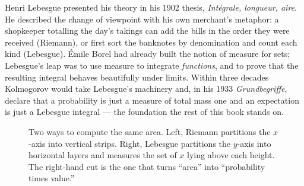 \begin{historybox}
Henri Lebesgue presented his theory in his 1902 thesis,
\emph{Int\'egrale, longueur, aire}. He described the change of viewpoint with
his own merchant's metaphor: a shopkeeper totalling the day's takings can add
the bills in the order they were received (Riemann), or first sort the
banknotes by denomination and count each kind (Lebesgue). Émile Borel had
already built the notion of measure for sets; Lebesgue's leap was to use measure
to integrate \emph{functions}, and to prove that the resulting integral behaves
beautifully under limits. Within three decades Kolmogorov would take Lebesgue's
machinery and, in his 1933 \emph{Grundbegriffe}, declare that a probability is
just a measure of total mass one and an expectation is just a Lebesgue
integral --- the foundation the rest of this book stands on.
\end{historybox}

\begin{figure}[H]
\centering
{}
\hspace{0.5cm}
\caption{Two ways to compute the same area. Left, Riemann partitions the
$x$-axis into vertical strips. Right, Lebesgue partitions the $y$-axis into
horizontal layers and measures the set of $x$ lying above each height. The
right-hand cut is the one that turns ``area'' into ``probability times value.''}
\label{ch37:fig-two-cuts}
\end{figure}

